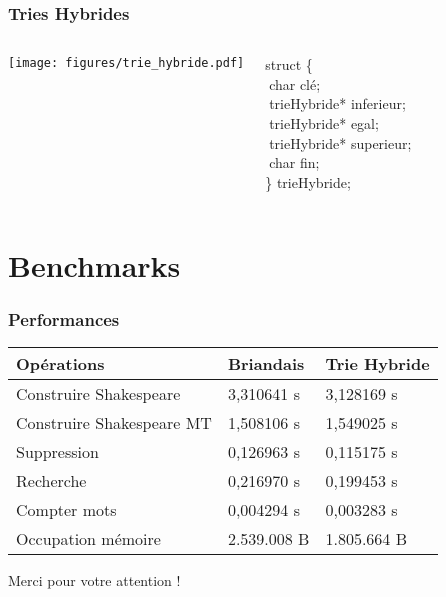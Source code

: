 \documentclass{beamer}
\begin{document}
\begin{frame}
\frametitle{Tries Hybrides}
\begin{columns}[c] %

\texttt{[image: figures/trie\_hybride.pdf]}

struct \{\\
   $\;$char clé;\\
   $\;$trieHybride* inferieur;\\
   $\;$trieHybride* egal;\\
   $\;$trieHybride* superieur;\\
   $\;$char fin;\\
\} trieHybride;

\end{columns}
\end{frame}

\section{Benchmarks}

\begin{frame}
\frametitle{Performances}
\begin{table}
\begin{tabular}{|l|l|l|}
\toprule
\textbf{Opérations} & \textbf{Briandais} & \textbf{Trie Hybride}\\
\midrule
Construire Shakespeare & 3,310641 s & 3,128169 s \\
Construire Shakespeare MT & 1,508106 s & 1,549025 s \\
Suppression & 0,126963 s & 0,115175 s \\
Recherche & 0,216970 s & 0,199453 s \\
Compter mots & 0,004294 s & 0,003283 s \\
Occupation mémoire & 2.539.008 B & 1.805.664 B \\
\bottomrule
\end{tabular}
\end{table}
\end{frame}


\begin{frame}
\Huge{\centerline{Merci pour votre attention !}}
\end{frame}

\end{document}
